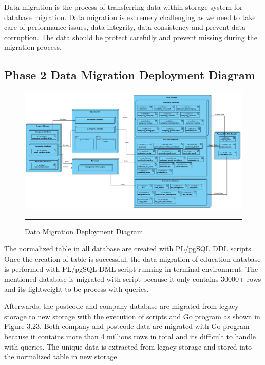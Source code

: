 Data migration is the process of transferring data within storage system for database migration. \cite{data-migration-definition} Data migration is extremely challenging as we need to take care of performance issues, data integrity, data consistency and prevent data corruption. The data should be protect carefully and prevent missing during the migration process. 

\begin{landscape}
	\subsection{Phase 2 Data Migration Deployment Diagram} 
	\begin{figure}[H]
		\centering
		\includegraphics[width=1.4\textwidth]{FYP2/Chapter3/FYP2-data-migration-deployment.png}
		\rule{35em}{0.5pt}
		\caption[Data Migration Deployment Diagram]{Data Migration Deployment Diagram}
	\end{figure}
\end{landscape}

The normalized table in all database are created with PL/pgSQL DDL scripts. Once the creation of table is successful, the data migration of education database is performed with PL/pgSQL DML script running in terminal environment. The mentioned database is migrated with script because it only contains 30000+ rows and its lightweight to be process with queries. 

Afterwards, the postcode and company database are migrated from legacy storage to new storage with the execution of scripts and Go program as shown in Figure 3.23. Both company and postcode data are migrated with Go program because it contains more than 4 millions rows in total and its difficult to handle with queries. The unique data is extracted from legacy storage and stored into the normalized table in new storage. 

